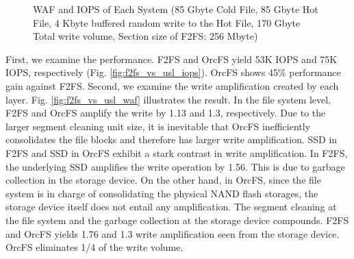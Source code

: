 \documentclass[prodmode,acmtecs]{acmsmall}
\begin{document}
\begin{figure}[t]
  \centering
   \caption{WAF and IOPS of Each System  (85 Gbyte Cold File, 85 Gbyte
     Hot File, 4 Kbyte buffered random write to the Hot File, 170
     Gbyte Total write volume, Section size of F2FS: 256
     Mbyte) \label{fig:f2fs_vs_usl}}
\end{figure}

First, we examine the performance. F2FS and OrcFS yield 53K IOPS and
75K IOPS, respectively (Fig. \ref{fig:f2fs_vs_usl_iops}). OrcFS shows
45\% performance gain against F2FS. Second, we examine the write
amplification created by each layer. Fig. \ref{fig:f2fs_vs_usl_waf}
illustrates the result. In the file system level, F2FS and OrcFS
amplify the write by 1.13 and 1.3, respectively. Due to the larger
segment cleaning unit size, it is inevitable that OrcFS inefficiently
consolidates the file blocks and therefore has larger write
amplification. SSD in F2FS and SSD in OrcFS exhibit a stark contrast in
write amplification. In F2FS, the underlying SSD amplifies the write
operation by 1.56. This is due to garbage collection in the storage
device. On the other hand, in OrcFS, since the file system is in charge
of consolidating the physical NAND flash storages, the storage device
itself does not entail any amplification.  The segment cleaning at the
file system and the garbage collection at the storage device
compounds. F2FS and OrcFS yields 1.76 and 1.3 write amplification seen
from the storage device. OrcFS eliminates 1/4 of the write volume.
\end{document}
